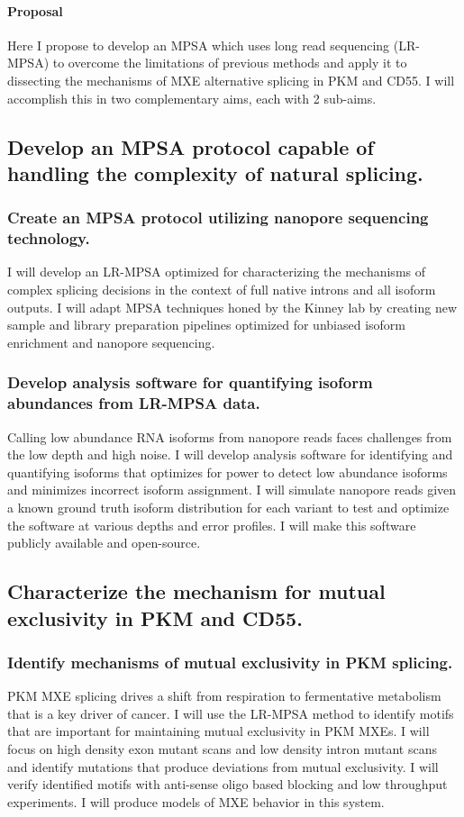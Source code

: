 \documentclass[11pt]{article}
\begin{document}
\paragraph{Proposal}
Here I propose to develop an MPSA which uses long read sequencing (LR-MPSA) to overcome the limitations of previous methods and apply it to dissecting the mechanisms of MXE alternative splicing in PKM and CD55.
I will accomplish this in two complementary aims, each with 2 sub-aims.

%
\subsection{Develop an MPSA protocol capable of handling the complexity of natural splicing.} \label{aim:MPSA_dev}
%
\subsubsection{Create an MPSA protocol utilizing nanopore sequencing technology.}
I will develop an LR-MPSA optimized for characterizing the mechanisms of complex splicing decisions in the context of full native introns and all isoform outputs.
I will adapt MPSA techniques honed by the Kinney lab by creating new sample and library preparation pipelines optimized for unbiased isoform enrichment and nanopore sequencing.
%
\subsubsection{Develop analysis software for quantifying isoform abundances from LR-MPSA data.} 
Calling low abundance RNA isoforms from nanopore reads faces challenges from the low depth and high noise.
I will develop analysis software for identifying and quantifying isoforms that optimizes for power to detect low abundance isoforms and minimizes incorrect isoform assignment.
I will simulate nanopore reads given a known ground truth isoform distribution for each variant to test and optimize the software at various depths and error profiles.
I will make this software publicly available and open-source.
%
\subsection{Characterize the mechanism for mutual exclusivity in PKM and CD55.}
%
\subsubsection{Identify mechanisms of mutual exclusivity in PKM splicing.}
PKM MXE splicing drives a shift from respiration to fermentative metabolism that is a key driver of cancer.
I will use the LR-MPSA method to identify motifs that are important for maintaining mutual exclusivity in PKM MXEs.
I will focus on high density exon mutant scans and low density intron mutant scans and identify mutations that produce deviations from mutual exclusivity.
I will verify identified motifs with anti-sense oligo based blocking and low throughput experiments.
I will produce models of MXE behavior in this system.
%
\end{document}
